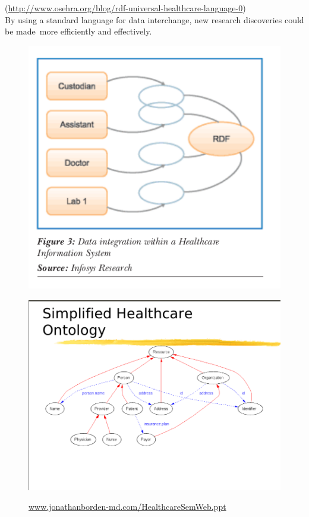 \documentclass[DIV=calc, paper=a4, fontsize=12pt, onecolumn]{scrartcl}	 %
\begin{document}
  (\url{http://www.osehra.org/blog/rdf-universal-healthcare-language-0})\\

  \noindent By using a standard language for data interchange, new research discoveries could be made\
  more efficiently and effectively.\

  \begin{figure}[ht!]
    \centering
    \includegraphics[scale=0.65]{rdfh.png}
    \caption{\citep{parachuri2008role}}
    \label{fig:rdfh}
  \end{figure}

  \begin{figure}[ht!]
    \centering
    \includegraphics[scale=0.4,trim=3 1 1 8,clip]{rdf1.png}\\
    \caption{\url{www.jonathanborden-md.com/HealthcareSemWeb.ppt‎}}
    \label{fig:rdf1}
  \end{figure}
   
\end{document}
